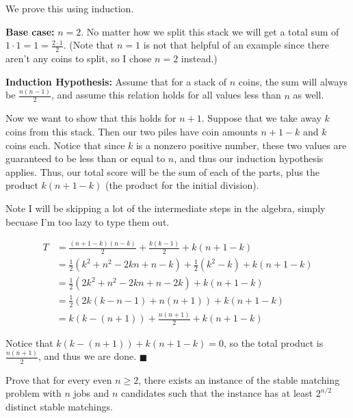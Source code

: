 \documentclass[11pt]{article}
\begin{document}
\begin{solution}
  We prove this using induction. 

  \textbf{Base case:} $n = 2$. No matter how we split this stack we will get a total sum of $1 \cdot 1 = 1 = \frac{2\cdot 1}{2}$. (Note that $n = 1$ is not that helpful of an example since there aren't any coins to split, so I chose $n = 2$ instead.)

  \textbf{Induction Hypothesis:} Assume that for a stack of $n$ coins, the sum will always be $\frac{n(n-1)}{2}$, and assume this relation holds for all values less than $n$ as well. 


  Now we want to show that this holds for $n+1$. Suppose that we take away $k$ coins from this stack. Then our two piles have coin amounts $n+1 -k$ and $k$ coins each. Notice that since $k$ is a nonzero positive number, these two values are guaranteed to be less than or equal to $n$, and thus our induction hypothesis applies. Thus, our total score will be the sum of each of the parts, plus the product $k(n+1-k)$ (the product for the initial division).

  Note I will be skipping a lot of the intermediate steps in the algebra, simply becuase I'm too lazy to type them out.

  \begin{align*}
    T &= \frac{(n+1-k)(n-k)}{2} + \frac{k(k-1)}{2} + k(n+1-k)\\
    &= \frac{1}{2}(k^2 + n^2 - 2kn +n - k) + \frac{1}{2}(k^2 - k) + k(n+1-k)\\
    &= \frac{1}{2}(2k^2 + n^2 - 2kn + n - 2k) + k(n+1 - k)\\
    &= \frac{1}{2}(2k(k - n - 1) + n(n+1)) + k(n+1-k)\\
    &= k(k-(n+1)) + \frac{n(n+1)}{2} + k(n+1-k)
  \end{align*}

  Notice that $k(k - (n+1)) + k(n+1-k) = 0$, so the total product is $\frac{n(n+1)}{2}$, and thus we are done. $\blacksquare$
\end{solution}


\pagebreak
{}

Prove that for every even $n \geq 2$, there exists an instance of the stable matching problem with $n$ jobs and $n$ candidates such that the instance has at least $2^{n/2}$ distinct stable matchings.
\end{document}
